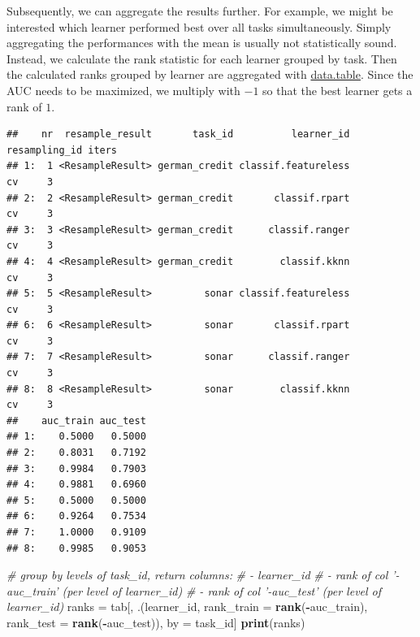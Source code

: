 \documentclass[]{scrbook}
\newenvironment{Shaded}{\begin{snugshade}}{\end{snugshade}}
\newcommand{\CommentTok}[1]{\textcolor[rgb]{0.56,0.35,0.01}{\textit{#1}}}
\newcommand{\DataTypeTok}[1]{\textcolor[rgb]{0.13,0.29,0.53}{#1}}
\newcommand{\KeywordTok}[1]{\textcolor[rgb]{0.13,0.29,0.53}{\textbf{#1}}}
\newcommand{\NormalTok}[1]{#1}
\newcommand{\OperatorTok}[1]{\textcolor[rgb]{0.81,0.36,0.00}{\textbf{#1}}}
\newcommand{\StringTok}[1]{\textcolor[rgb]{0.31,0.60,0.02}{#1}}
\renewenvironment{Shaded} {\begin{snugshade}\small} {\end{snugshade}}
\begin{document}
Subsequently, we can aggregate the results further.
For example, we might be interested which learner performed best over all tasks simultaneously.
Simply aggregating the performances with the mean is usually not statistically sound.
Instead, we calculate the rank statistic for each learner grouped by task.
Then the calculated ranks grouped by learner are aggregated with \href{https://cran.r-project.org/package=data.table}{data.table}.
Since the AUC needs to be maximized, we multiply with \(-1\) so that the best learner gets a rank of \(1\).

\begin{Shaded}
\end{Shaded}

\begin{verbatim}
##    nr  resample_result       task_id          learner_id resampling_id iters
## 1:  1 <ResampleResult> german_credit classif.featureless            cv     3
## 2:  2 <ResampleResult> german_credit       classif.rpart            cv     3
## 3:  3 <ResampleResult> german_credit      classif.ranger            cv     3
## 4:  4 <ResampleResult> german_credit        classif.kknn            cv     3
## 5:  5 <ResampleResult>         sonar classif.featureless            cv     3
## 6:  6 <ResampleResult>         sonar       classif.rpart            cv     3
## 7:  7 <ResampleResult>         sonar      classif.ranger            cv     3
## 8:  8 <ResampleResult>         sonar        classif.kknn            cv     3
##    auc_train auc_test
## 1:    0.5000   0.5000
## 2:    0.8031   0.7192
## 3:    0.9984   0.7903
## 4:    0.9881   0.6960
## 5:    0.5000   0.5000
## 6:    0.9264   0.7534
## 7:    1.0000   0.9109
## 8:    0.9985   0.9053
\end{verbatim}

\begin{Shaded}
\begin{Highlighting}[]
\CommentTok{# group by levels of task_id, return columns:}
\CommentTok{# - learner_id}
\CommentTok{# - rank of col '-auc_train' (per level of learner_id)}
\CommentTok{# - rank of col '-auc_test' (per level of learner_id)}
\NormalTok{ranks =}\StringTok{ }\NormalTok{tab[, .(learner_id, }\DataTypeTok{rank_train =} \KeywordTok{rank}\NormalTok{(}\OperatorTok{-}\NormalTok{auc_train), }\DataTypeTok{rank_test =} \KeywordTok{rank}\NormalTok{(}\OperatorTok{-}\NormalTok{auc_test)), by =}\StringTok{ }\NormalTok{task_id]}
\KeywordTok{print}\NormalTok{(ranks)}
\end{Highlighting}
\end{Shaded}
\end{document}
